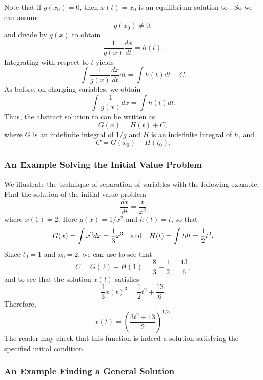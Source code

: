 Note that if $g(x_0)=0$, then $x(t)=x_0$ is an equilibrium solution to 
.  So we can assume 
\begin{equation} \label{eq:gx0}
g(x_0)\not=0,
\end{equation}
and divide  by $g(x)$ to obtain
\[
\frac{1}{g(x)}\frac{dx}{dt}= h(t).
\]
Integrating with respect to $t$ yields
\[
\int \frac{1}{g(x)} \frac{dx}{dt}dt = \int h(t) dt + C.
\]
As before, on changing variables, we obtain
\[
\int\frac{1}{g(x)} dx = \int h(t) dt.
\]
Thus, the abstract solution to  can be written as
\begin{equation} \label{E:G=H+K}
G(x) = H(t) + C,
\end{equation}
where $G$ is an indefinite integral of $1/g$ and $H$ is an indefinite 
integral of $h$, and 
\begin{equation}  \label{E:G=H+Kinit}
C = G(x_0)-H(t_0).
\end{equation}



\subsubsection*{An Example Solving the Initial Value Problem}

We illustrate the technique of separation of variables with the following
example.  Find the solution of the initial value problem
\[
\frac{dx}{dt} = \frac{t}{x^2} 
\]
where $x(1)=2$.  Here $g(x) = 1/x^2$ and $h(t) = t$, so that
\[
G(x)=\int x^2 dx= \frac{1}{3}x^3 \quad\mbox{and}\quad H(t) = \int t dt = \frac{1}{2}t^2.
\]
Since $t_0=1$ and $x_0=2$, we can use  to see that 
\[
C = G(2)-H(1) = \frac{8}{3} -\frac{1}{2} = \frac{13}{6},
\]
and  to see that the solution $x(t)$ satisfies
\[
\frac{1}{3}x(t)^3 = \frac{1}{2}t^2 + \frac{13}{6}.
\]
Therefore,
\[
x(t) = \left(\frac{3t^2+13}{2}\right)^{1/3}.
\]
The reader may check that this function is indeed a solution
satisfying the specified initial condition.

\subsubsection*{An Example Finding a General Solution}

